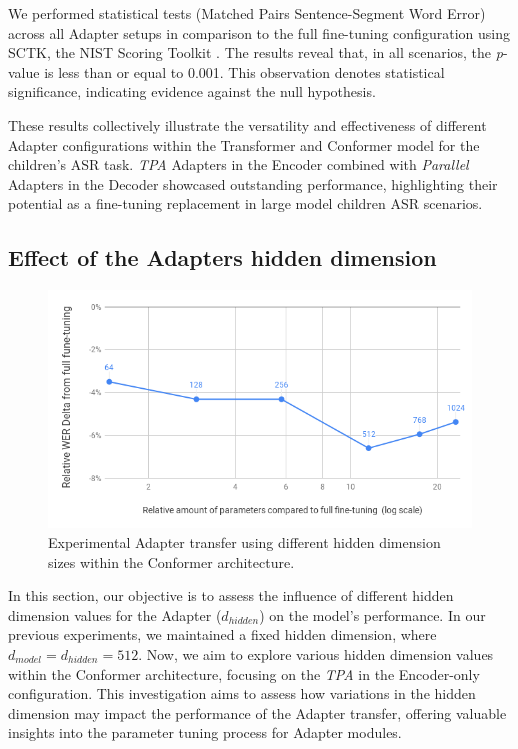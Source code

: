 We performed statistical tests (Matched Pairs Sentence-Segment Word Error) across all Adapter setups in comparison to the full fine-tuning configuration using SCTK, the NIST Scoring Toolkit \cite{SCTK_nist}. 
The results reveal that, in all scenarios, the \textit{p}-value is less than or equal to 0.001. This observation denotes statistical significance, indicating evidence against the null hypothesis. 

These results collectively illustrate the versatility and effectiveness of different Adapter configurations within the Transformer and  Conformer model for the children's \ac{ASR} task. \textit{\ac{TPA}} Adapters in the Encoder combined with \textit{Parallel} Adapters in the Decoder showcased outstanding performance, highlighting their potential as a fine-tuning replacement in large model children \ac{ASR} scenarios.

\subsection{Effect of the Adapters hidden dimension}
\label{sec:hidden_size_adapter}
\begin{figure}[h]
    \begin{center}
    \includegraphics[scale=0.5]{imgs/HiddenDimEXP.png}
    \caption{Experimental Adapter transfer using different hidden dimension sizes within the Conformer architecture.}
    \label{fig:HiddenDim}    
\end{center}
    
\end{figure}

In this section, our objective is to assess the influence of different hidden dimension values for the Adapter ($d_{hidden}$) on the model's performance. In our previous experiments, we maintained a fixed hidden dimension, where $d_{model} = d_{hidden} = 512$. Now, we aim to explore various hidden dimension values within the Conformer architecture, focusing on the \textit{\ac{TPA}} in the Encoder-only configuration. This investigation aims to assess how variations in the hidden dimension may impact the performance of the Adapter transfer, offering valuable insights into the parameter tuning process for Adapter modules.

